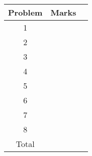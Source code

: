 \documentclass{assignment}
\begin{document}
\begin{center}
\renewcommand{\arraystretch}{2}
\begin{tabular}{|c|c|c|} \hline
Problem & Marks \\ \hline \hline
1 & \\ \hline
2 & \\ \hline
3 & \\ \hline
4 & \\ \hline
5 & \\ \hline
6 & \\ \hline
7 & \\ \hline
8 & \\ \hline \hline
Total & \\ \hline
\end{tabular}
\end{center}

\bigskip
\end{document}
